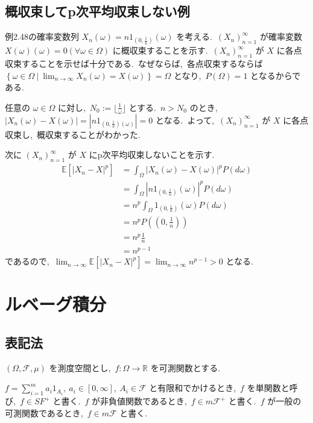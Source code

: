 \documentclass[a4j,11pt]{jarticle}
\theoremstyle{definition}
\begin{document}
\subsection{概収束してp次平均収束しない例}
例2.48の確率変数列
$X_n(\omega)=n1_{(0,\frac{1}{n})}(\omega)$
を考える.\ 
$(X_n)_{n=1}^\infty$
が確率変数
$X(\omega)(\omega)=0(\forall \omega \in \Omega)$
に概収束することを示す.\ 
$(X_n)_{n=1}^{\infty}$
が
$X$
に各点収束することを示せば十分である.\ 
なぜならば,\ 各点収束するならば
$\left\{\omega \in \Omega \ | \ \lim_{n\to\infty}X_n(\omega) = X(\omega) \right\} = \Omega$
となり,\ 
$P(\Omega) = 1$
となるからである.\ 

任意の
$\omega \in \Omega$
に対し,\ 
$N_0 := \lfloor \frac{1}{\omega} \rfloor$
とする.\ 
$n > N_0$
のとき,\ 
$|X_n(\omega)-X(\omega)| = |n1_{(0,\frac{1}{n})(\omega)}| = 0$
となる.\ 
よって,\ 
$(X_n)_{n=1}^{\infty}$
が
$X$
に各点収束し,\ 概収束することがわかった.\ 

次に
$(X_n)_{n=1}^{\infty}$
が
$X$
にp次平均収束しないことを示す.\ 
\begin{align}
  \mathbb{E}[|X_n-X|^p]
  & = \int_{\Omega} |X_n(\omega) - X(\omega)|^p P(d\omega) \\
  & = \int_{\Omega} |n1_{\left( 0,\frac{1}{n}\right)}(\omega)|^p P(d\omega) \\
  & = n^p \int_{\Omega} 1_{\left( 0, \frac{1}{n}\right)}(\omega) P(d\omega) \\
  & = n^p P\left( \left( 0,\frac{1}{n}\right)\right) \\
  & = n^p \frac{1}{n} \\
  & = n^{p-1}
\end{align}
であるので,\ 
$\lim_{n\to\infty} \mathbb{E}[|X_n-X|^p] = \lim_{n\to\infty} n^{p-1} > 0$
となる.\ 


\section{ルベーグ積分}
\subsection{表記法}
  $(\Omega,\mathcal{F},\mu)$
  を測度空間とし,\ 
  $f:\Omega \to \mathbb{R}$
  を可測関数とする.\ 

  $f = \sum_{i=1}^m a_i 1_{A_i},\ a_i \in \left[ 0, \infty\right],\ A_i \in \mathcal{F}$
  と有限和でかけるとき,\ 
  $f$
  を単関数と呼び,\ 
  $f \in SF^+$
  と書く.\ 
  $f$
  が非負値関数であるとき,\ 
  $f \in m\mathcal{F}^+$
  と書く.\ 
  $f$
  が一般の可測関数であるとき,\ 
  $f \in m\mathcal{F}$
  と書く.\ 
\end{document}
